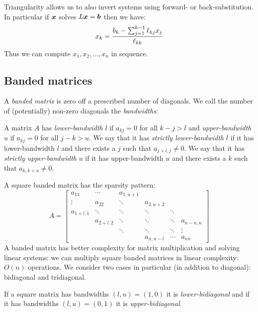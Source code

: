 Triangularity allows us to also invert systems using forward- or back-substitution. In particular if $\bm{{\mbox{\boldmath$x$\unboldmath}}}$ solves $L \bm{{\mbox{\boldmath$x$\unboldmath}}} = \bm{{\mbox{\boldmath$b$\unboldmath}}}$ then we have:
\[
x_k = {b_k - \ensuremath{\sum}_{j=1}^{k-1} \ensuremath{\ell}_{kj} x_j \over \ensuremath{\ell}_{kk}}
\]
Thus we can compute $x_1,x_2,\ensuremath{\ldots},x_n$ in sequence.

\subsection{Banded matrices}
A \emph{banded matrix} is zero off a prescribed number of diagonals. We call the number of (potentially) non-zero diagonals the \emph{bandwidths}:

\begin{definition}[bandwidths] A matrix $A$ has \emph{lower-bandwidth} $l$ if $a_{kj} = 0$ for all $k-j > l$ and \emph{upper-bandwidth} $u$ if $a_{kj} = 0$ for all $j-k > u$. We say that it has \emph{strictly lower-bandwidth} $l$ if it has lower-bandwidth $l$ and there exists a $j$ such that $a_{j+l,j} \ensuremath{\neq} 0$. We say that it has \emph{strictly upper-bandwidth} $u$ if it has upper-bandwidth $u$ and there exists a $k$ such that $a_{k,k+u} \ensuremath{\neq} 0$. \end{definition}

A square banded matrix has the sparsity pattern:
\[
A = \begin{bmatrix}
a_{11} & \ensuremath{\cdots} & a_{1,u+1} \\
\ensuremath{\vdots} & a_{22} & \ensuremath{\ddots} &  a_{2,u+2} \\
a_{1+l,1} & \ensuremath{\ddots} & \ensuremath{\ddots} & \ensuremath{\ddots} & \ensuremath{\ddots} \\
& a_{2+l,2} & \ensuremath{\ddots} & \ensuremath{\ddots} &  \ensuremath{\ddots} & a_{n-u,n} \\
&& \ensuremath{\ddots} & \ensuremath{\ddots} & \ensuremath{\ddots} & \ensuremath{\vdots} \\
&&& a_{n,n-l} & \ensuremath{\cdots} & a_{nn}
\end{bmatrix}
\]
A banded matrix has better complexity for matrix multiplication and solving linear systems:  we can multiply square banded matrices in linear complexity: $O(n)$ operations. We consider two cases in particular (in addition to diagonal): bidiagonal and tridiagonal.

\begin{definition}[Bidiagonal] If a square matrix has bandwidths $(l,u) = (1,0)$ it is \emph{lower-bidiagonal} and if it has bandwidths $(l,u) = (0,1)$ it is \emph{upper-bidiagonal}. \end{definition}

